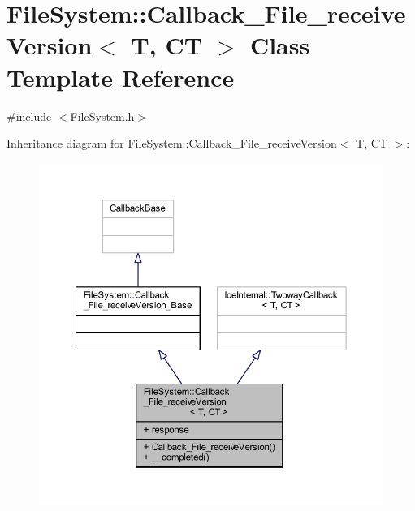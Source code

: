 \hypertarget{class_file_system_1_1_callback___file__receive_version}{}\section{File\+System\+:\+:Callback\+\_\+\+File\+\_\+receive\+Version$<$ T, C\+T $>$ Class Template Reference}
\label{class_file_system_1_1_callback___file__receive_version}


{\ttfamily \#include $<$File\+System.\+h$>$}



Inheritance diagram for File\+System\+:\+:Callback\+\_\+\+File\+\_\+receive\+Version$<$ T, C\+T $>$\+:
\nopagebreak
\begin{figure}[H]
\begin{center}
\leavevmode
\includegraphics[width=350pt]{class_file_system_1_1_callback___file__receive_version__inherit__graph}
\end{center}
\end{figure}


